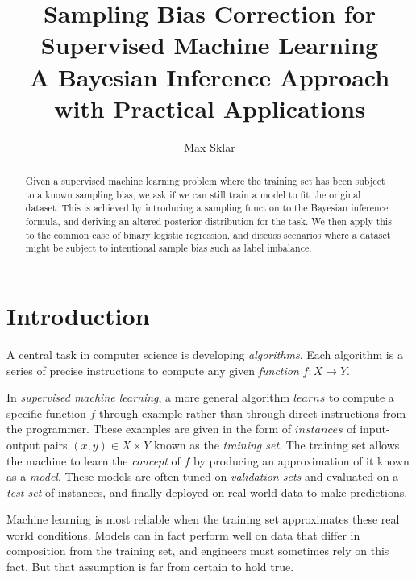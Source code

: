 \documentclass[twoside]{article}
\begin{document}
\parindent=0in
\parskip=12pt


\title{
  Sampling Bias Correction for Supervised Machine Learning \\
  \large{
    A Bayesian Inference Approach with Practical Applications
  }
}

\author{Max Sklar}

\maketitle
\thispagestyle{empty}

\begin{abstract}
Given a supervised machine learning problem where the training set has been subject to a known sampling bias, we ask if we can still train a model to fit the original dataset. This is achieved by introducing a sampling function to the Bayesian inference formula, and deriving an altered posterior distribution for the task. We then apply this to the common case of binary logistic regression, and discuss scenarios where a dataset might be subject to intentional sample bias such as label imbalance.
\end{abstract}

\section{Introduction}
\label{section:introduction}

A central task in computer science is developing \textit{algorithms}. Each algorithm is a series of precise instructions to compute any given \textit{function} \(f: X \to Y\).

In \textit{supervised machine learning}, a more general algorithm \(learns\) to compute a specific function \(f\) through example rather than through direct instructions from the programmer. These examples are given in the form of \(instances\) of input-output pairs \((x, y) \in X \times Y\) known as the \textit{training set}. The training set allows the machine to learn the \textit{concept} of \(f\) by producing an approximation of it known as a \textit{model}. These models are often tuned on \textit{validation sets} and evaluated on a \textit{test set} of instances, and finally deployed on real world data to make predictions.

Machine learning is most reliable when the training set approximates these real world conditions. Models can in fact perform well on data that differ in composition from the training set, and engineers must sometimes rely on this fact. But that assumption is far from certain to hold true.
\end{document}
